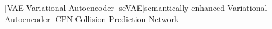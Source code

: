 [VAE]{Variational Autoencoder}
[seVAE]{semantically-enhanced Variational Autoencoder}
[CPN]{Collision Prediction Network}